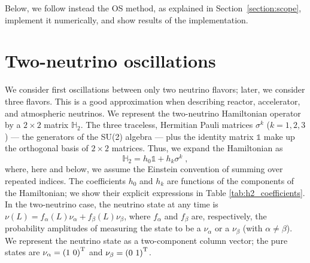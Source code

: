 \documentclass[final,5p,times,twocolumn]{elsarticle}
\begin{document}
Below, we follow instead the OS method, as explained in Section\ \ref{section:scope}, implement it numerically, and show results of the implementation.




\section{Two-neutrino oscillations}
\label{section:two_flavors}

We consider first oscillations between only two neutrino flavors; later, we consider three flavors.  This is a good approximation when describing reactor, accelerator, and atmospheric neutrinos.  We represent the two-neutrino Hamiltonian operator by a $2 \times 2$ matrix $\mathbb{H}_2$.  The three traceless, Hermitian Pauli matrices $\sigma^k$ ($k=1,2,3$) --- the generators of the SU(2) algebra --- plus the identity matrix $\mathbb{1}$ make up the orthogonal basis of $2 \times 2$ matrices.  Thus, we expand the Hamiltonian as
\begin{equation}
 \label{equ:h2_expansion}
 \mathbb{H}_2 = h_0 \mathbb{1} + h_k \sigma^k \;,
\end{equation}
where, here and below, we assume the Einstein convention of summing over repeated indices.  The coefficients $h_0$ and $h_k$ are functions of the components of the Hamiltonian; we show their explicit expressions in Table \ref{tab:h2_coefficients}.  In the two-neutrino case, the neutrino state at any time is $\nu(L) = f_\alpha(L) \nu_\alpha + f_\beta(L) \nu_\beta$, where $f_\alpha$ and $f_\beta$ are, respectively, the probability amplitudes of measuring the state to be a $\nu_\alpha$ or a $\nu_\beta$ (with $\alpha \neq \beta$).  We represent the neutrino state as a two-component column vector; the pure states are $\nu_\alpha = \left(1~0\right)^{\rm T}$ and $\nu_\beta = \left(0~1\right)^{\rm T}$.
\end{document}
